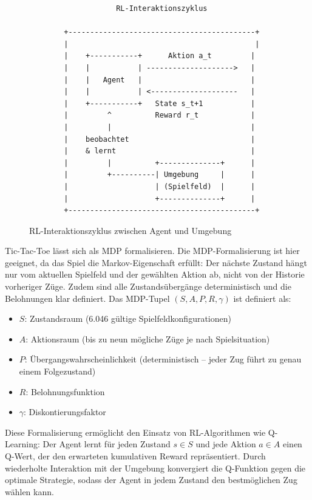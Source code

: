 \begin{figure}[h]
\centering
\begin{verbatim}
                    RL-Interaktionszyklus
                    
        +-------------------------------------------+
        |                                           |
        |    +-----------+      Aktion a_t         |
        |    |           | -------------------->   |
        |    |   Agent   |                         |
        |    |           | <--------------------   |
        |    +-----------+   State s_t+1           |
        |         ^          Reward r_t            |
        |         |                                |
        |    beobachtet                            |
        |    & lernt                               |
        |         |          +--------------+      |
        |         +----------| Umgebung     |      |
        |                    | (Spielfeld)  |      |
        |                    +--------------+      |
        +-------------------------------------------+
\end{verbatim}
\caption{\ac{RL}-Interaktionszyklus zwischen Agent und Umgebung}
\end{figure}


\break Tic-Tac-Toe lässt sich als \ac{MDP} formalisieren. Die MDP-Formalisierung ist hier geeignet, da das Spiel die Markov-Eigenschaft erfüllt: Der nächste Zustand hängt nur vom aktuellen Spielfeld und der gewählten Aktion ab, nicht von der Historie vorheriger Züge. Zudem sind alle Zustandsübergänge deterministisch und die Belohnungen klar definiert. Das MDP-Tupel $(S, A, P, R, \gamma)$ ist definiert als:
\begin{itemize}
    \item $S$: Zustandsraum (6.046 gültige Spielfeldkonfigurationen)
    \item $A$: Aktionsraum (bis zu neun mögliche Züge je nach Spielsituation)
    \item $P$: Übergangswahrscheinlichkeit (deterministisch -- jeder Zug führt zu genau einem Folgezustand)
    \item $R$: Belohnungsfunktion
    \item $\gamma$: Diskontierungsfaktor
\end{itemize}

Diese Formalisierung ermöglicht den Einsatz von \ac{RL}-Algorithmen wie Q-Learning: Der Agent lernt für jeden Zustand $s \in S$ und jede Aktion $a \in A$ einen Q-Wert, der den erwarteten kumulativen Reward repräsentiert. Durch wiederholte Interaktion mit der Umgebung konvergiert die Q-Funktion gegen die optimale Strategie, sodass der Agent in jedem Zustand den bestmöglichen Zug wählen kann.

